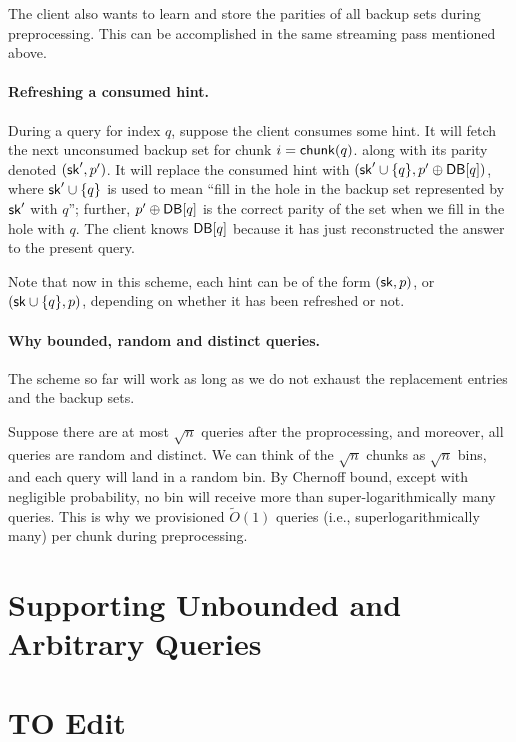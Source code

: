 The client also wants to learn and store the parities of all backup sets
during preprocessing.
This can be accomplished in the same streaming pass 
mentioned above.


\paragraph{Refreshing a consumed hint.}
During a query for index $q$, 
suppose the client consumes some hint. %
It will fetch
the next unconsumed backup set 
for chunk $i = {\sf chunk}(q)$.
along with its parity denoted $({\sf sk}', p')$.
It will replace the consumed hint with $({\sf sk}' \cup \{q\}, p' \oplus {\sf DB}[q])$,
where ${\sf sk}' \cup \{q\}$ is used to mean ``fill in the hole in the backup set represented
by ${\sf sk}'$ with $q$''; further, 
$p' \oplus {\sf DB}[q]$ is the correct parity of the set when we fill in the hole with $q$.
The client knows ${\sf DB}[q]$ because it has just reconstructed the answer to the present query.

Note that now in this scheme, 
each hint can be of the form $({\sf sk}, p)$, or $({\sf sk} \cup \{q\}, p)$, depending on whether
it has been refreshed or not.


\paragraph{Why bounded, random and distinct
queries.}
The scheme so far will work as long as we do not exhaust
the replacement entries and the backup sets.

Suppose there are at most $\sqrt{n}$ queries after the proprocessing,
and moreover, all queries are random and distinct.
We can think of the $\sqrt{n}$ chunks
as $\sqrt{n}$ bins, and 
each query will land in a random bin.
By Chernoff bound,  
except with negligible probability, 
no bin will receive more than super-logarithmically many queries.
This is why we provisioned $\widetilde{O}(1)$ queries (i.e., superlogarithmically many)
per chunk during preprocessing. 

\section{Supporting Unbounded and Arbitrary Queries}
 
\section{TO Edit}






